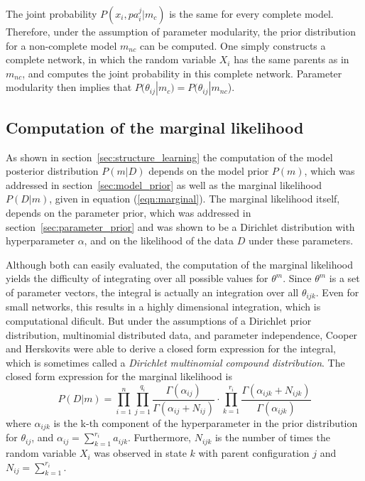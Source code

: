 \documentclass{article}
\begin{document}
	The joint probability $P(x_i, pa_i^j|m_c)$ is the same for every complete model. Therefore,
	under the assumption of parameter modularity, the prior distribution for a non-complete model $m_{nc}$ can
	be computed. One simply constructs a complete network, in which the random variable $X_i$ has the
	same parents as in $m_{nc}$, and computes the joint probability in this complete network. Parameter
	modularity then implies that $P(\theta_{ij}|m_c)= P(\theta_{ij}|m_{nc}$).
	
	\subsection{Computation of the marginal likelihood}
	As shown in section~\ref{sec:structure_learning} the computation of the model posterior distribution $P(m|D)$ depends on
	the model prior $P(m)$,	which was addressed in section~\ref{sec:model_prior} as well as the marginal likelihood $P(D|m)$,
	given in equation (\ref{eqn:marginal}). The marginal likelihood itself, depends on the parameter prior, which was
	addressed in section~\ref{sec:parameter_prior} and was shown to be a Dirichlet distribution with hyperparameter $\alpha$, and on
	the likelihood of the data $D$ under these parameters.
	
  Although both can easily evaluated, the computation of the marginal likelihood yields the difficulty of integrating
  over all possible values for $\theta^m$. Since $\theta^m$ is a set of parameter vectors, the
  integral is actually an integration over all $\theta_{ijk}$. Even for small networks, this results
  in a highly dimensional integration, which is computational dificult. 
  But under the assumptions of a Dirichlet prior distribution,
  multinomial distributed data, and parameter independence, Cooper and Herskovits	 were able
  to derive a closed form expression for the integral, which is sometimes called a
  \textit{Dirichlet multinomial compound distribution}. The closed form expression for the marginal
  likelihood is
  \begin{equation}
  	P(D|m)=\prod_{i=1}^n \prod_{j=1}^{q_i} \frac{\Gamma(\alpha_{ij})}{\Gamma(\alpha_{ij}+N_{ij})}
  	\cdot \prod_{k=1}^{r_i} \frac{\Gamma(\alpha_{ijk}+N_{ijk})}{\Gamma(\alpha_{ijk})}
  	\label{eqn:closed_form}
  \end{equation}
  where $\alpha_{ijk}$ is the k-th component of the hyperparameter in the prior distribution for
  $\theta_{ij}$, and $\alpha_{ij}=\sum_{k=1}^{r_i}a_{ijk}$. Furthermore, $N_{ijk}$ is the number
  of times the random variable $X_i$ was observed in state $k$ with parent configuration $j$ and
  $N_{ij} = \sum_{k=1}^{r_i}$. 
\end{document}
